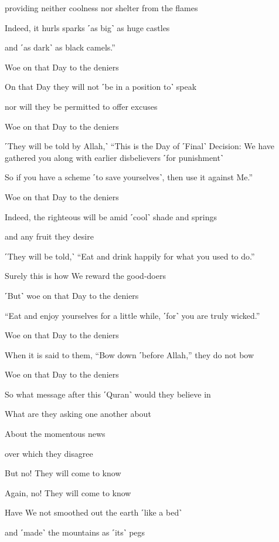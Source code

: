 providing neither coolness nor shelter from the flames

Indeed, it hurls sparks ˹as big˺ as huge castles

and ˹as dark˺ as black camels.”

Woe on that Day to the deniers

On that Day they will not ˹be in a position to˺ speak

nor will they be permitted to offer excuses

Woe on that Day to the deniers

˹They will be told by Allah,˺ “This is the Day of ˹Final˺ Decision: We have gathered you along with earlier disbelievers ˹for punishment˺

So if you have a scheme ˹to save yourselves˺, then use it against Me.”

Woe on that Day to the deniers

Indeed, the righteous will be amid ˹cool˺ shade and springs

and any fruit they desire

˹They will be told,˺ “Eat and drink happily for what you used to do.”

Surely this is how We reward the good-doers

˹But˺ woe on that Day to the deniers

“Eat and enjoy yourselves for a little while, ˹for˺ you are truly wicked.”

Woe on that Day to the deniers

When it is said to them, “Bow down ˹before Allah,” they do not bow

Woe on that Day to the deniers

So what message after this ˹Quran˺ would they believe in

What are they asking one another about

About the momentous news

over which they disagree

But no! They will come to know

Again, no! They will come to know

Have We not smoothed out the earth ˹like a bed˺

and ˹made˺ the mountains as ˹its˺ pegs

